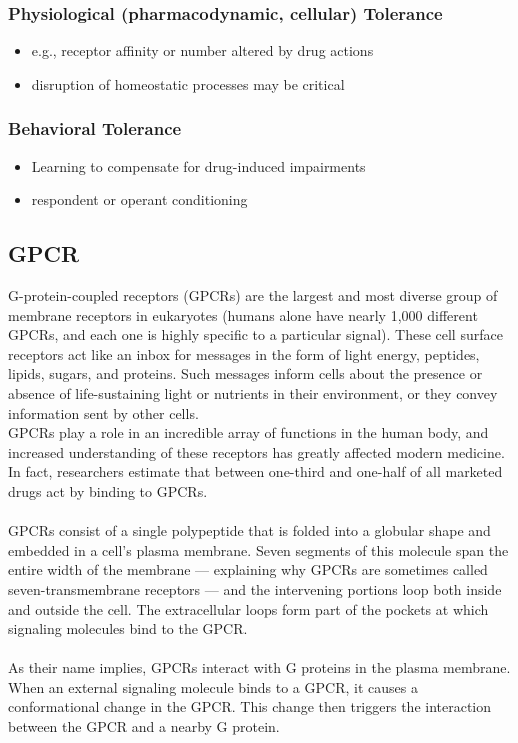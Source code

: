 \documentclass{book}
\begin{document}
\subsubsection{Physiological (pharmacodynamic, cellular) Tolerance}
\begin{itemize}
    \item e.g., receptor affinity or number altered by drug actions
    \item disruption of homeostatic processes may be critical
\end{itemize}

\subsubsection{Behavioral Tolerance}
\begin{itemize}
    \item Learning to compensate for drug-induced impairments
    \item respondent or operant conditioning
\end{itemize}

\subsection{GPCR}
G-protein-coupled receptors (GPCRs) are the largest and most diverse group of membrane receptors in eukaryotes (humans alone have nearly 1,000 different GPCRs, and each one is highly specific to a particular signal). 
These cell surface receptors act like an inbox for messages in the form of light energy, peptides, lipids, sugars, and proteins. 
Such messages inform cells about the presence or absence of life-sustaining light or nutrients in their environment, or they convey information sent by other cells.
\\
GPCRs play a role in an incredible array of functions in the human body, and increased understanding of these receptors has greatly affected modern medicine. 
In fact, researchers estimate that between one-third and one-half of all marketed drugs act by binding to GPCRs.
\\
\\
GPCRs consist of a single polypeptide that is folded into a globular shape and embedded in a cell's plasma membrane. 
Seven segments of this molecule span the entire width of the membrane — explaining why GPCRs are sometimes called seven-transmembrane receptors — and the intervening portions loop both inside and outside the cell. 
The extracellular loops form part of the pockets at which signaling molecules bind to the GPCR.
\\
\\
As their name implies, GPCRs interact with G proteins in the plasma membrane. 
When an external signaling molecule binds to a GPCR, it causes a conformational change in the GPCR. 
This change then triggers the interaction between the GPCR and a nearby G protein.
\end{document}
